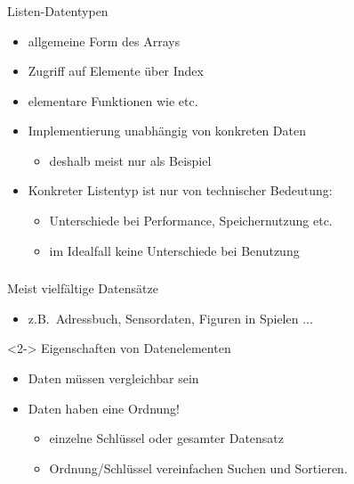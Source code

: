 \begin{frame}
\frametitle{ \insertsection}
\begin{block}
{Listen-Datentypen}
\begin{itemize}
    \item allgemeine Form des Arrays
    \item Zugriff auf Elemente über Index
    \item elementare Funktionen wie  etc.
    \item Implementierung unabhängig von konkreten Daten
        \begin{itemize}
            \item deshalb meist nur  als Beispiel
        \end{itemize}
    \item Konkreter Listentyp ist nur von technischer Bedeutung:
    \begin{itemize}
        \item Unterschiede bei Performance, Speichernutzung etc.
        \item im Idealfall keine Unterschiede bei Benutzung
    \end{itemize}
\end{itemize}
\end{block}
\end{frame}

\begin{frame}
\frametitle{\insertsection}
\begin{block}
{Meist vielfältige Datensätze}
\begin{itemize}
    \item z.B.\ Adressbuch, Sensordaten, Figuren in Spielen ...
\end{itemize}
\end{block}
\begin{block}<2->
{Eigenschaften von Datenelementen}
\begin{itemize}
    \item \alert{Daten müssen vergleichbar sein}
    \item \alert{Daten haben eine Ordnung!}
    \begin{itemize}
        \item einzelne Schlüssel oder gesamter Datensatz
        \item Ordnung/Schlüssel vereinfachen Suchen und Sortieren.
    \end{itemize}
\end{itemize}
\end{block}

\end{frame}

\endinput

\begin{frame}
\frametitle{\insertsection}
\begin{block}
{}
\end{block}
\end{frame}